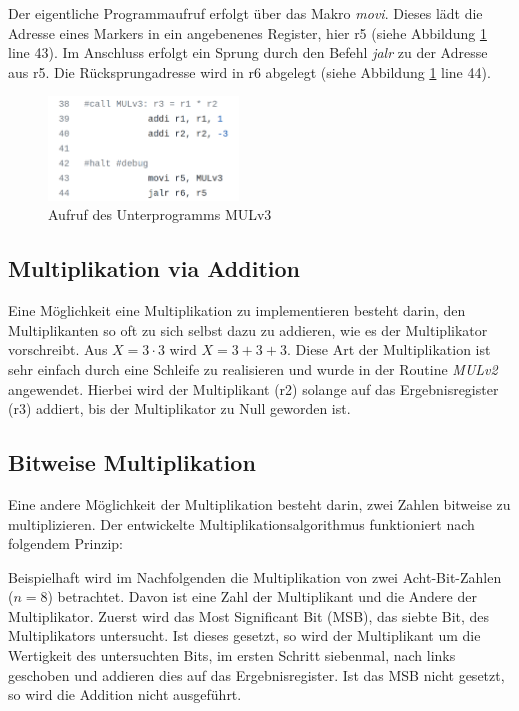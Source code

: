 \documentclass[fleqn, a4paper, 11pt]{article}       %
\begin{document}
Der eigentliche Programmaufruf erfolgt über das Makro \emph{movi}. Dieses lädt die Adresse eines Markers in ein angebenenes Register, hier r5 (siehe Abbildung \ref{fig:FKT} line 43). Im Anschluss erfolgt ein Sprung durch den Befehl \emph{jalr} zu der Adresse aus r5. Die Rücksprungadresse wird in r6 abgelegt (siehe Abbildung \ref{fig:FKT} line 44).

\begin{figure}[h]
    \includegraphics[width =0.45\textwidth]{Funktionsaufruf.png}
\caption{Aufruf des Unterprogramms MULv3}
\label{fig:FKT}
\end{figure}


\subsection{Multiplikation via Addition}
Eine Möglichkeit eine Multiplikation zu implementieren besteht darin, den Multiplikanten so oft zu sich selbst dazu zu addieren, wie es der Multiplikator vorschreibt. Aus $X = 3 \cdot 3$ wird  $X = 3+3+3$. Diese Art der Multiplikation ist sehr einfach durch eine Schleife zu realisieren und wurde in der Routine \emph{MULv2} angewendet. Hierbei wird der Multiplikant (r2) solange auf das Ergebnisregister (r3) addiert, bis der Multiplikator zu Null geworden ist. 

\subsection{Bitweise Multiplikation}
Eine andere Möglichkeit der Multiplikation besteht darin, zwei Zahlen bitweise zu multiplizieren. Der entwickelte Multiplikationsalgorithmus funktioniert nach folgendem Prinzip: 

Beispielhaft wird im Nachfolgenden die Multiplikation von zwei Acht-Bit-Zahlen \\ ($n = 8$) betrachtet. Davon ist eine Zahl der Multiplikant und die Andere der Multiplikator. Zuerst wird das Most Significant Bit (MSB), das siebte Bit, des Multiplikators untersucht. Ist dieses gesetzt, so wird der Multiplikant um die Wertigkeit des untersuchten Bits, im ersten Schritt siebenmal, nach links geschoben und addieren dies auf das Ergebnisregister. Ist das MSB nicht gesetzt, so wird die Addition nicht ausgeführt. \cite{MULv3}
\end{document}
